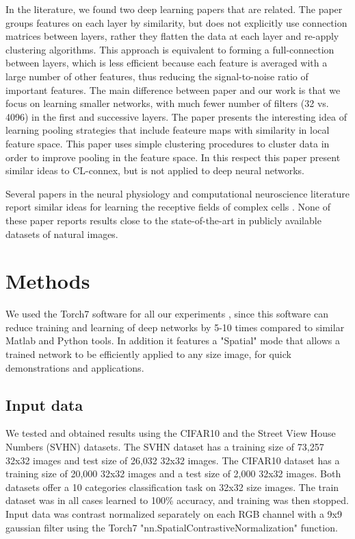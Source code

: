 \documentclass{article} %
\begin{document}
In the literature, we found two deep learning papers that are related. 
The paper \cite{coates2012learning} groups features on each layer by similarity, but does not explicitly use connection matrices between layers, rather they flatten the data at each layer and re-apply clustering algorithms. This approach is equivalent to forming a full-connection between layers, which is less efficient because each feature is averaged with a large number of other features, thus reducing the signal-to-noise ratio of important features. The main difference between paper \cite{coates2012learning} and our work is that we focus on learning smaller networks, with much fewer number of filters (32 vs. 4096) in the first and successive layers. 
The paper \cite{boureau_2011} presents the interesting idea of learning pooling strategies that include feateure maps with similarity in local feature space. This paper uses simple clustering procedures to cluster data in order to improve pooling in the feature space. In this respect this paper present similar ideas to CL-connex, but is not applied to deep neural networks.

Several papers in the neural physiology and computational neuroscience literature report similar ideas for learning the receptive fields of complex cells \cite{masquelier2007learning,spratling2005learning,wiskott2002slow,wallis1997invariant}. None of these paper reports results close to the state-of-the-art in publicly available datasets of natural images.


\section{Methods}
\label{sec-methods}


We used the Torch7 software for all our experiments \cite{collobert_torch7_2011}, since this software can reduce training and learning of deep networks by 5-10 times compared to similar Matlab and Python tools. In addition it features a "Spatial" mode that allows a trained network to be efficiently applied to any size image, for quick demonstrations and applications.


\subsection{Input data}

We tested and obtained results using the CIFAR10 \cite{krizhevsky_learning_2009} and the Street View House Numbers (SVHN) \cite{netzer_reading_2011} datasets. The SVHN dataset has a training size of 73,257 32x32 images and test size of 26,032 32x32 images. The CIFAR10 dataset has a training size of 20,000 32x32 images and a test size of 2,000 32x32 images. Both datasets offer a 10 categories classification task on 32x32 size images. The train dataset was in all cases learned to 100\% accuracy, and training was then stopped. Input data was contrast normalized separately on each RGB channel with a 9x9 gaussian filter using the Torch7 "nn.SpatialContrastiveNormalization" function.
\end{document}
